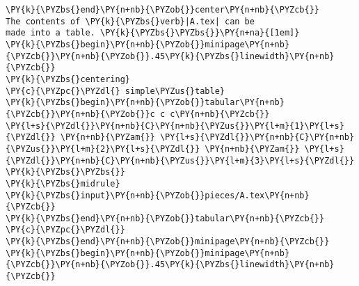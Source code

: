 \begin{Verbatim}[commandchars=\\\{\}]
\PY{k}{\PYZbs{}end}\PY{n+nb}{\PYZob{}}center\PY{n+nb}{\PYZcb{}}
The contents of \PY{k}{\PYZbs{}verb}|A.tex| can be 
made into a table. \PY{k}{\PYZbs{}\PYZbs{}}\PY{n+na}{[1em]}
\PY{k}{\PYZbs{}begin}\PY{n+nb}{\PYZob{}}minipage\PY{n+nb}{\PYZcb{}}\PY{n+nb}{\PYZob{}}.45\PY{k}{\PYZbs{}linewidth}\PY{n+nb}{\PYZcb{}}
\PY{k}{\PYZbs{}centering}
\PY{c}{\PYZpc{}\PYZdl{} simple\PYZus{}table}
\PY{k}{\PYZbs{}begin}\PY{n+nb}{\PYZob{}}tabular\PY{n+nb}{\PYZcb{}}\PY{n+nb}{\PYZob{}}c c c\PY{n+nb}{\PYZcb{}}
\PY{l+s}{\PYZdl{}}\PY{n+nb}{C}\PY{n+nb}{\PYZus{}}\PY{l+m}{1}\PY{l+s}{\PYZdl{}} \PY{n+nb}{\PYZam{}} \PY{l+s}{\PYZdl{}}\PY{n+nb}{C}\PY{n+nb}{\PYZus{}}\PY{l+m}{2}\PY{l+s}{\PYZdl{}} \PY{n+nb}{\PYZam{}} \PY{l+s}{\PYZdl{}}\PY{n+nb}{C}\PY{n+nb}{\PYZus{}}\PY{l+m}{3}\PY{l+s}{\PYZdl{}} \PY{k}{\PYZbs{}\PYZbs{}}
\PY{k}{\PYZbs{}midrule}
\PY{k}{\PYZbs{}input}\PY{n+nb}{\PYZob{}}pieces/A.tex\PY{n+nb}{\PYZcb{}}
\PY{k}{\PYZbs{}end}\PY{n+nb}{\PYZob{}}tabular\PY{n+nb}{\PYZcb{}}
\PY{c}{\PYZpc{}\PYZdl{}}
\PY{k}{\PYZbs{}end}\PY{n+nb}{\PYZob{}}minipage\PY{n+nb}{\PYZcb{}}
\PY{k}{\PYZbs{}begin}\PY{n+nb}{\PYZob{}}minipage\PY{n+nb}{\PYZcb{}}\PY{n+nb}{\PYZob{}}.45\PY{k}{\PYZbs{}linewidth}\PY{n+nb}{\PYZcb{}}
\end{Verbatim}
